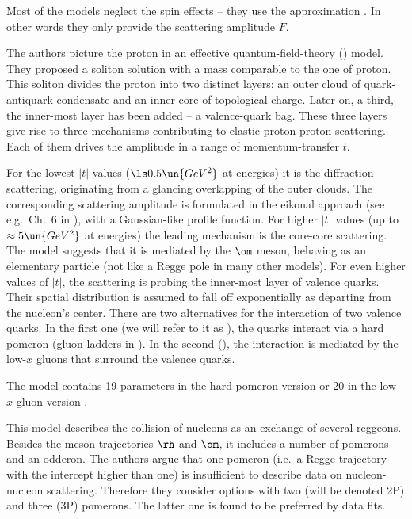 Most of the models neglect the spin effects -- they use the approximation . In other words they only provide the scattering amplitude $F$.

\def\OutlineLabel{The model of Islam et al.}

The authors picture the proton in an effective quantum-field-theory () model. They proposed a soliton solution with a mass comparable to the one of proton. This soliton divides the proton into two distinct layers: an outer cloud of quark-antiquark condensate and an inner core of topological charge. Later on, a third, the inner-most layer has been added -- a valence-quark bag. These three layers give rise to three mechanisms contributing to elastic proton-proton scattering. Each of them drives the amplitude in a range of momentum-transfer $t$.

For the lowest $|t|$ values ($\ls 0.5\un{GeV^2}$ at  energies) it is the diffraction scattering, originating from a glancing overlapping of the outer clouds. The corresponding scattering amplitude is formulated in the eikonal approach (see e.g.~Ch.~6 in ), with a Gaussian-like profile function. For higher $|t|$ values (up to $\approx 5\un{GeV^2}$ at  energies) the leading mechanism is the core-core scattering. The  model suggests that it is mediated by the $\rm\om$ meson, behaving as an elementary particle (not like a Regge pole in many other models). For even higher values of $|t|$, the scattering is probing the inner-most layer of valence quarks. Their spatial distribution is assumed to fall off exponentially as departing from the nucleon's center. There are two alternatives for the interaction of two valence quarks. In the first one (we will refer to it as ), the quarks interact via a hard pomeron (gluon ladders in ). In the second (), the interaction is mediated by the low-$x$ gluons that surround the valence quarks.

The model contains 19 parameters in the hard-pomeron version  or 20 in the low-$x$ gluon version .

\def\OutlineLabel{The model of Petrov et al.}

This model describes the collision of nucleons as an exchange of several reggeons. Besides the meson trajectories $\rm\rh$ and $\rm\om$, it includes a number of pomerons and an odderon. The authors argue that one pomeron (i.e.~a Regge trajectory with the intercept higher than one) is insufficient to describe data on nucleon-nucleon scattering. Therefore they consider options with two (will be denoted 2P) and three (3P) pomerons. The latter one is found to be preferred by data fits.

